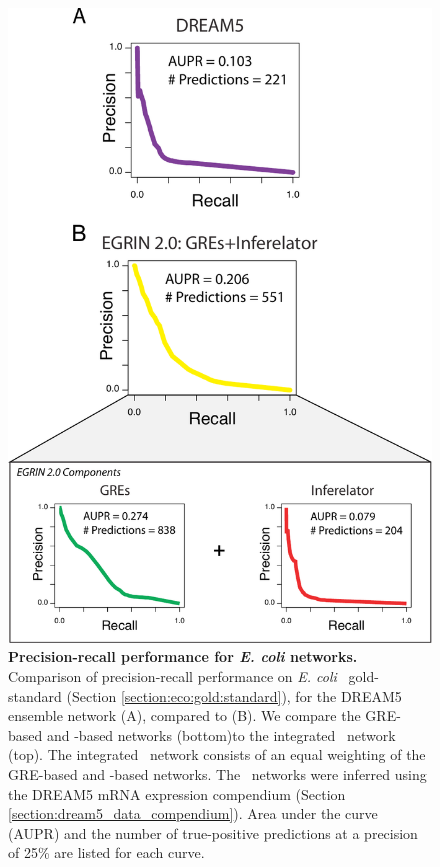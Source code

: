 \begin{figure}[h!]
\centering
\includegraphics[width=0.8\linewidth]{figures/aupr.pdf}
\caption[Precision-recall performance for {\it E. coli}
  networks.]{\textbf{Precision-recall performance for \textit{E. coli}
    networks.} Comparison of precision-recall performance on {\it
    E. coli} \rdb~gold-standard (Section
  \ref{section:eco:gold:standard}), for the DREAM5 ensemble network
  (A), compared to \egrine (B).  We compare the GRE-based and
  \nwinf-based networks (bottom)to the integrated \egrine~network
  (top). The integrated \egrine~network consists of an equal weighting
  of the GRE-based and \nwinf-based networks.  The \egrine~networks
  were inferred using the DREAM5 mRNA expression compendium (Section
  \ref{section:dream5_data_compendium}). Area under the curve (AUPR)
  and the number of true-positive predictions at a precision of 25\%
  are listed for each curve.}
\label{fig:pr_curves}
\end{figure}

